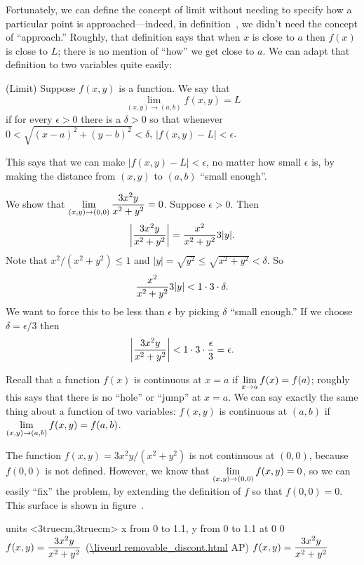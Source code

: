 Fortunately, we can define the concept of limit without needing to
specify how a particular point is approached---indeed, in 
definition~, we didn't need the concept of
``approach.'' Roughly, that definition says that when $x$ is 
close to $a$ then $f(x)$ is close to $L$; there is no mention of
``how'' we get close to $a$. We can adapt that definition to two
variables quite easily:

 (Limit) Suppose $f(x,y)$ is a function. We say that 
$$\lim_{(x,y)\to
  (a,b)}f(x,y)=L$$
 if for every $\epsilon>0$ there is a $\delta > 0$ so that
  whenever $0 < \sqrt{(x-a)^2+(y-b)^2} < \delta$, $|f(x,y)-L|<\epsilon$.
\enddef

This says that we can make $|f(x,y)-L|<\epsilon$, no matter how small
$\epsilon$ is, by making the distance from $(x,y)$ to $(a,b)$ ``small
enough''. 

\example We show that $\displaystyle \lim_{(x,y)\to(0,0)}{3x^2y\over
  x^2+y^2}=0$. Suppose $\epsilon>0$. Then
$$\left|{3x^2y\over x^2+y^2}\right|={x^2\over x^2+y^2}3|y|.$$
Note that $x^2/(x^2+y^2)\le1$ and
$|y|=\sqrt{y^2}\le\sqrt{x^2+y^2}<\delta$. So
$${x^2\over x^2+y^2}3|y|<1\cdot 3\cdot \delta.$$
We want to force this to be less than $\epsilon$ by picking $\delta$
``small enough.'' If we choose $\delta=\epsilon/3$ then
$$\left|{3x^2y\over x^2+y^2}\right|< 1\cdot 3\cdot{\epsilon\over3}=
\epsilon.$$
\endexample

Recall that a function $f(x)$ is continuous at $x=a$ if 
$\displaystyle\lim_{x\to a}f(x)=f(a)$; roughly this says that there is no
``hole'' or ``jump'' at $x=a$. We can say exactly the same thing about
a function of two variables: $f(x,y)$ is continuous at $(a,b)$ if 
$\displaystyle\lim_{(x,y)\to (a,b)}f(x,y)=f(a,b)$.

\example The function $f(x,y)=3x^2y/(x^2+y^2)$ is not continuous at $(0,0)$,
because $f(0,0)$ is not defined. However, we know that 
$\displaystyle \lim_{(x,y)\to(0,0)}f(x,y)=0$, so we can easily ``fix'' the
problem, by extending the definition of $f$ so that $f(0,0)=0$.
This surface is shown in figure~.
\endexample

\figure
\texonly
\vbox{\beginpicture
\normalgraphs
\ninepoint
\setcoordinatesystem units <3truecm,3truecm>
\setplotarea x from 0 to 1.1, y from 0 to 1.1
 at 0 0
\endpicture}
\begincaption
$\displaystyle f(x,y)={3x^2y\over x^2+y^2}$
(\expandafter\url\expandafter{\liveurl removable_discont.html}%
AP\endurl)
\endcaption
\endtexonly
{}
\htmlonly
\begincaption
$\displaystyle f(x,y)={3x^2y\over x^2+y^2}$
\endcaption
\endhtmlonly
\endfigure

